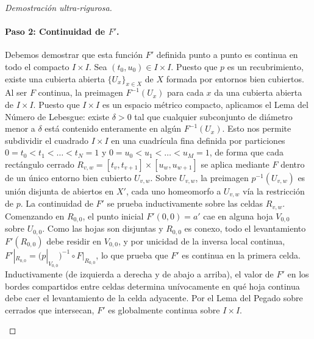 \documentclass[11pt,a4paper]{article}
\theoremstyle{definition}
\theoremstyle{remark}
\numberwithin{equation}{section}
\begin{document}
\begin{proof}[Demostración ultra-rigurosa]
\paragraph{Paso 2: Continuidad de $F'$.} Debemos demostrar que esta función $F'$ definida punto a punto es continua en todo el compacto $I \times I$. Sea $(t_0, u_0) \in I \times I$. Puesto que $p$ es un recubrimiento, existe una cubierta abierta $\{U_x\}_{x \in X}$ de $X$ formada por entornos bien cubiertos. Al ser $F$ continua, la preimagen $F^{-1}(U_x)$ para cada $x$ da una cubierta abierta de $I \times I$. Puesto que $I \times I$ es un espacio métrico compacto, aplicamos el Lema del Número de Lebesgue: existe $\delta > 0$ tal que cualquier subconjunto de diámetro menor a $\delta$ está contenido enteramente en algún $F^{-1}(U_x)$. 
Esto nos permite subdividir el cuadrado $I \times I$ en una cuadrícula fina definida por particiones $0=t_0 < t_1 < \dots < t_N = 1$ y $0=u_0 < u_1 < \dots < u_M = 1$, de forma que cada rectángulo cerrado $R_{v,w} = [t_v, t_{v+1}] \times [u_w, u_{w+1}]$ se aplica mediante $F$ dentro de un único entorno bien cubierto $U_{v,w}$. 
Sobre $U_{v,w}$, la preimagen $p^{-1}(U_{v,w})$ es unión disjunta de abiertos en $X'$, cada uno homeomorfo a $U_{v,w}$ vía la restricción de $p$. La continuidad de $F'$ se prueba inductivamente sobre las celdas $R_{v,w}$. Comenzando en $R_{0,0}$, el punto inicial $F'(0,0) = a'$ cae en alguna hoja $V_{0,0}$ sobre $U_{0,0}$. Como las hojas son disjuntas y $R_{0,0}$ es conexo, todo el levantamiento $F'(R_{0,0})$ debe residir en $V_{0,0}$, y por unicidad de la inversa local continua, $F'|_{R_{0,0}} = (p|_{V_{0,0}})^{-1} \circ F|_{R_{0,0}}$, lo que prueba que $F'$ es continua en la primera celda. Inductivamente (de izquierda a derecha y de abajo a arriba), el valor de $F'$ en los bordes compartidos entre celdas determina unívocamente en qué hoja continua debe caer el levantamiento de la celda adyacente. Por el Lema del Pegado sobre cerrados que intersecan, $F'$ es globalmente continua sobre $I \times I$.

\begin{center}
\end{center}
\end{proof}
\end{document}
